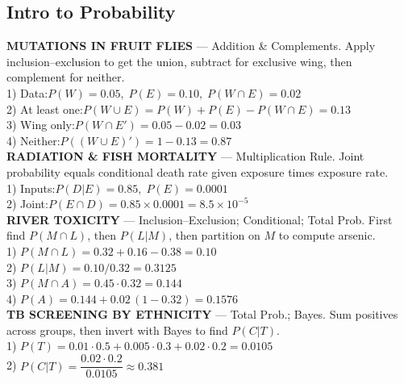 \documentclass[landscape,0.4pt]{article}
\begin{document}
\tiny%
\begin{multicols*}{6}


\section*{\small{Intro to Probability}}
\vspace{3pt}
\textbf{\tiny{MUTATIONS IN FRUIT FLIES}} — Addition \& Complements.  Apply inclusion–exclusion to get the union, subtract for exclusive wing, then complement for neither.\\
1) Data:\;$P(W)=0.05,\;P(E)=0.10,\;P(W\cap E)=0.02$\\
2) At least one:\;$P(W\cup E)=P(W)+P(E)-P(W\cap E)=0.13$\\
3) Wing only:\;$P(W\cap E')=0.05-0.02=0.03$\\
4) Neither:\;$P((W\cup E)')=1-0.13=0.87$\\[-2pt]

\textbf{\tiny{RADIATION \& FISH MORTALITY}} — Multiplication Rule.  Joint probability equals conditional death rate given exposure times exposure rate.\\
1) Inputs:\;$P(D|E)=0.85,\;P(E)=0.0001$\\
2) Joint:\;$P(E\cap D)=0.85\times0.0001=8.5{\times}10^{-5}$\\[-2pt]

\textbf{\tiny{RIVER TOXICITY}} — Inclusion–Exclusion; Conditional; Total Prob.  First find $P(M\cap L)$, then $P(L|M)$, then partition on $M$ to compute arsenic.\\
1) $P(M\cap L)=0.32+0.16-0.38=0.10$\\
2) $P(L|M)=0.10/0.32=0.3125$\\
3) $P(M\cap A)=0.45\cdot0.32=0.144$\\
4) $P(A)=0.144+0.02\,(1-0.32)=0.1576$\\[-2pt]

\textbf{\tiny{TB SCREENING BY ETHNICITY}} — Total Prob.; Bayes.  Sum positives across groups, then invert with Bayes to find $P(C|T)$.\\
1) $P(T)=0.01\cdot0.5+0.005\cdot0.3+0.02\cdot0.2=0.0105$\\
2) $P(C|T)=\dfrac{0.02\cdot0.2}{0.0105}\approx0.381$\\[-2pt]


\end{multicols*}
\end{document}
